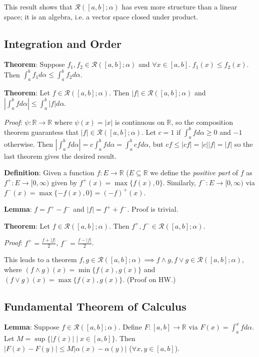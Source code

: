 \documentclass[11pt]{article}
\begin{document}
This result shows that $\mathcal{R}([a,b]; \alpha)$ has even more structure than a linear space; it is an algebra, i.e. a vector space closed under product.

\subsection{Integration and Order}

\textbf{Theorem}: Suppose $f_1, f_2 \in \mathcal{R}([a,b]; \alpha)$ and $\forall x \in [a,b].\; f_1(x) \leq f_2(x)$. Then $\int_a^b f_1 d\alpha \leq \int_a^b f_2 d\alpha$.

\textbf{Theorem}: Let $f \in \mathcal{R}([a,b]; \alpha)$. Then $|f| \in \mathcal{R}([a,b]; \alpha)$ and $|\int_a^b f d\alpha| \leq \int_a^b |f| d\alpha$.

\emph{Proof}: $\psi : \mathbb{R} \to \mathbb{R}$ where $\psi(x) = |x|$ is continuous on $\mathbb{R}$, so the composition theorem guarantess that $|f| \in \mathcal{R}([a,b]; \alpha)$. Let $c = 1$ if $\int_a^b f d\alpha \geq 0$ and $-1$ otherwise. Then $|\int_a^b f d\alpha| = c\int_a^b f d\alpha = \int_a^b cf d\alpha$, but $cf \leq |cf| = |c||f| = |f|$ so the last theorem gives the desired result.

\textbf{Definition}: Given a function $f : E \to \mathbb{R}$ ($E \subseteq \mathbb{R}$ we define the \emph{positive part} of $f$ as $f^+ : E \to [0, \infty)$ given by $f^+(x) = \max \{f(x), 0\}$. Similarly, $f^- : E \to [0, \infty)$ via $f^-(x) = \max \{-f(x), 0\} = (-f)^+(x)$.

\textbf{Lemma}: $f = f^+ - f^-$ and $|f| = f^+ + f^-$. Proof is trivial.

\textbf{Theorem}: Let $f \in \mathcal{R}([a,b]; \alpha)$. Then $f^+, f^- \in \mathcal{R}([a,b]; \alpha)$.

\emph{Proof}: $f^+ = \frac{f+|f|}{2}$, $f^- = \frac{f-|f|}{2}$.

This leads to a theorem $f, g \in \mathcal{R}([a,b]; \alpha) \implies f \land g, f \lor g \in \mathcal{R}([a,b]; \alpha)$, where $(f \land g)(x) = \min\{f(x), g(x)\}$ and $(f \lor g)(x) = \max \{f(x), g(x)\}$. (Proof on HW.)

\subsection{Fundamental Theorem of Calculus}

\textbf{Lemma}: Suppose $f \in \mathcal{R}([a,b]; \alpha)$. Define $F : [a,b] \to \mathbb{R}$ via $F(x) = \int_a^x f d\alpha$. Let $M = \sup \{|f(x)| \mid x \in [a,b]\}$. Then $|F(x) - F(y)| \leq M|\alpha(x) - \alpha(y)|$ ($\forall x,y \in [a,b]$).
\end{document}
